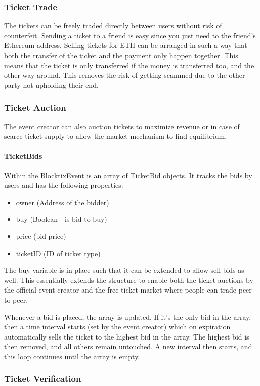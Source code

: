 \documentclass[a4paper]{article}
\begin{document}
\subsubsection{Ticket Trade}
The tickets can be freely traded directly between users without risk of counterfeit. Sending a ticket to a friend is easy since you just need to the friend's Ethereum address. Selling tickets for ETH can be arranged in such a way that both the transfer of the ticket and the payment only happen together. This means that the ticket is only transferred if the money is transferred too, and the other way around. This removes the risk of getting scammed due to the other party not upholding their end.

\subsubsection{Ticket Auction}
The event creator can also auction tickets to maximize revenue or in case of scarce ticket supply to allow the market mechanism to find equilibrium. 

\paragraph{TicketBids} 
Within the BlocktixEvent is an array of TicketBid objects. It tracks the bids by users and has the following properties:
\begin{itemize}
\item owner (Address of the bidder)
\item buy (Boolean - is bid to buy)
\item price (bid price)
\item ticketID (ID of ticket type)
\end{itemize}

The buy variable is in place such that it can be extended to allow sell bids as well. This essentially extends the structure to enable both the ticket auctions by the official event creator and the free ticket market where people can trade peer to peer. 

Whenever a bid is placed, the array is updated. If it's the only bid in the array, then a time interval starts (set by the event creator) which on expiration automatically sells the ticket to the highest bid in the array. The highest bid is then removed, and all others remain untouched. A new interval then starts, and this loop continues until the array is empty.

\subsubsection{Ticket Verification}
\end{document}
